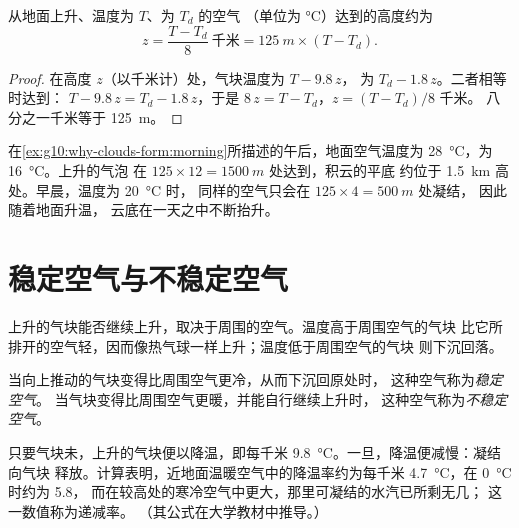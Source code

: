 \begin{proposition}[凝结高度的确定]\label{prop:g10:why-clouds-form:lcl}
从地面上升、温度为 $T$、为 $T_d$ 的空气
（单位为 \unit{\degreeCelsius}）达到的高度约为
\[
  z = \frac{T - T_d}{8}\ \text{千米} = \qty{125}{m} \times (T - T_d).
\]
\end{proposition}

\begin{proof}
在高度 $z$（以千米计）处，气块温度为 $T - 9.8\,z$，
为 $T_d - 1.8\,z$。二者相等时达到：
$T - 9.8\,z = T_d - 1.8\,z$，于是 $8\,z = T - T_d$，$z = (T - T_d)/8$ 千米。
八分之一千米等于 \qty{125}{m}。
\end{proof}

\begin{example}[一个午后的积云]\label{ex:g10:why-clouds-form:base}
在\cref{ex:g10:why-clouds-form:morning}所描述的午后，地面空气温度为
\qty{28}{\degreeCelsius}，为 \qty{16}{\degreeCelsius}。上升的气泡
在 $125 \times 12 = \qty{1500}{m}$ 处达到，积云的平底
约位于 \qty{1.5}{km} 高处。早晨，温度为 \qty{20}{\degreeCelsius} 时，
同样的空气只会在 $125 \times 4 = \qty{500}{m}$ 处凝结，
因此随着地面升温，
云底在一天之中不断抬升。
\end{example}

\section{稳定空气与不稳定空气}

上升的气块能否继续上升，取决于周围的空气。温度高于周围空气的气块
比它所排开的空气轻，因而像热气球一样上升；温度低于周围空气的气块
则下沉回落。

\begin{definition}\label{def:g10:why-clouds-form:stability}
当向上推动的气块变得比周围空气更冷，从而下沉回原处时，
这种空气称为\emph{稳定空气}。
当气块变得比周围空气更暖，并能自行继续上升时，
这种空气称为\emph{不稳定空气}。
\end{definition}

只要气块未，上升的气块便以降温，即每千米
\qty{9.8}{\degreeCelsius}。一旦，降温便减慢：凝结向气块
释放。计算表明，近地面温暖空气中的降温率约为每千米
\qty{4.7}{\degreeCelsius}，在 \qty{0}{\degreeCelsius} 时约为 \num{5.8}，
而在较高处的寒冷空气中更大，那里可凝结的水汽已所剩无几；
这一数值称为递减率。
（其公式在大学教材中推导。）

